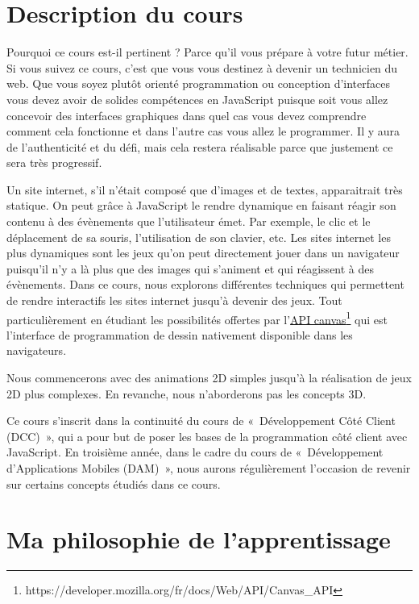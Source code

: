 \section{Description du cours}

Pourquoi ce cours est-il pertinent ? Parce qu'il vous prépare à votre futur métier. Si vous suivez ce cours, c'est que vous vous destinez à devenir un technicien du web. Que vous soyez plutôt orienté programmation ou conception d'interfaces vous devez avoir de solides compétences en JavaScript puisque soit vous allez concevoir des interfaces graphiques dans quel cas vous devez comprendre comment cela fonctionne et dans l'autre cas vous allez le programmer. Il y aura de l'authenticité et du défi, mais cela restera réalisable parce que justement ce sera très progressif.


Un site internet, s’il n’était composé que d’images et de textes, apparaitrait très statique. On peut grâce à JavaScript le rendre dynamique en faisant réagir son contenu à des évènements que l’utilisateur émet. Par exemple, le clic et le déplacement de sa souris, l’utilisation de son clavier, etc. Les sites internet les plus dynamiques sont les jeux qu’on peut directement jouer dans un navigateur puisqu'il n'y a là plus que des images qui s’animent et qui réagissent à des évènements.
Dans ce cours, nous explorons différentes techniques qui permettent de rendre interactifs les sites internet jusqu’à devenir des jeux. Tout particulièrement en étudiant les possibilités offertes par l’\href{https://developer.mozilla.org/fr/docs/Web/API/Canvas_API}{API canvas}\footnote{https://developer.mozilla.org/fr/docs/Web/API/Canvas\_API} qui est l'interface  de programmation de dessin nativement disponible dans les navigateurs.

Nous commencerons avec des animations 2D simples jusqu’à la réalisation de jeux 2D plus complexes. En revanche, nous n’aborderons pas les concepts 3D.

Ce cours s’inscrit dans la continuité du cours de «~Développement Côté Client (DCC)~», qui a pour but de poser les bases de la programmation côté client avec JavaScript. En troisième année, dans le cadre du cours de «~Développement d'Applications Mobiles (DAM)~», nous aurons régulièrement l’occasion de revenir sur certains concepts étudiés dans ce cours.
\clearpage
\section{Ma philosophie de l’apprentissage}

